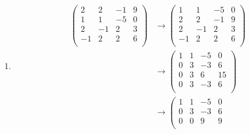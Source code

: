\documentclass{article}
\begin{document}
\begin{enumerate}[(i)]
\begin{enumerate}
\begin{align*}
\begin{array}{ccc|c}
        \end{array}
      \right) \\
    \end{align*}
    \[
      \begin{array}{llll}
        x_1 &     &+ 2x_3 &= -1 \\
            & x_2 &+ 2x_3 &= 0  \\
      \end{array}
    \]
    \[
      \begin{array}{llll}
        x_1 &     &     &= -1 - 2 * t \\
            & x_2 &     &= - 2 * t  \\
            &     & x_3 &= t  \\
      \end{array}
    \]
  \item
    \begin{align*}
      \left(
      \begin{array}{ccc|c}
        2  & 2  & -1 & 9\\
        1  & 1  & -5 & 0\\
        2  & -1 & 2  & 3\\
        -1 & 2  & 2  & 6\\
      \end{array}
      \right)
      &\rightarrow
      \left(
        \begin{array}{ccc|c}
          1  & 1  & -5 & 0\\
          2  & 2  & -1 & 9\\
          2  & -1 & 2  & 3\\
          -1 & 2  & 2  & 6\\
        \end{array}
      \right) \\
      &\rightarrow
      \left(
        \begin{array}{ccc|c}
          1  & 1  & -5 & 0\\
          0  & 3  & -3 & 6\\
          0  & 3  & 6  & 15\\
          0  & 3  & -3 & 6\\
        \end{array}
      \right) \\
      &\rightarrow
      \left(
        \begin{array}{ccc|c}
          1  & 1  & -5 & 0\\
          0  & 3  & -3 & 6\\
          0  & 0  & 9  & 9\\

\end{array}
\end{align*}
\end{enumerate}
\end{enumerate}
\end{document}
